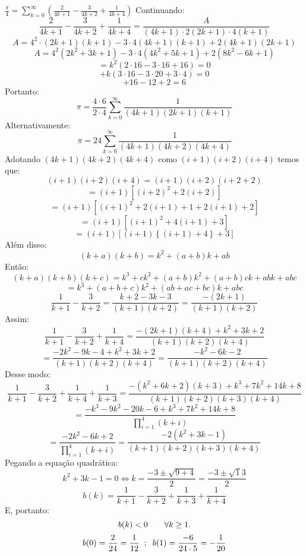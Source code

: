 \documentclass[12pt]{article}
\begin{document}
\hspace{2.5cm} \(\frac{\pi}{4}=\sum_{k=0}^{\infty}\left ( \frac{2}{4k+1}-\frac{3}{4k+2}+\frac{1}{4k+4}\right)\)
\newpage
\normalsize{}
Continuando:
\[
\frac{2}{4k+1} - \frac{3}{4k+2} + \frac{1}{4k+4} = \frac{A}{(4k+1)\cdot2(2k+1)\cdot4(k+1)}
\]
\[A=4^2\cdot(2k+1)(k+1)-3\cdot4(4k+1)(k+1)+2(4k+1)(2k+1)\]
\[
A = 4^{2} \left( 2k^2 + 3k + 1 \right) - 3 \cdot 4 \left( 4k^{2} + 5k + 1 \right) + 2\left(8k^{2} - 6k + 1 \right)
\]
\[
= k^{2} \left( 2 \cdot 16 - 3 \cdot 16 + 16 \right) = 0
\]
\[
+ k\left(3 \cdot 16 - 3 \cdot 20 + 3 \cdot 4\right) = 0
\]
\[
+ 16 - 12 + 2 = 6
\]
Portanto:
\[
\pi = \frac{4 \cdot 6}{2 \cdot 4} \sum_{k=0}^{\infty} \frac{1}{(4k+1)(2k+1)(k+1)}
\]
Alternativamente:
\[
\pi = 24 \sum_{k=0}^{\infty} \frac{1}{(4k+1)(4k+2)(4k+4)} 
\]
Adotando \((4k+1)(4k+2)(4k+4)\) como \((i+1)(i+2)(i+4)\) temos que:
\[
(i+1)(i+2)(i+4) = (i+1)(i+2)(i+2+2)\] 
\[= (i+1)\left[(i+2)^{2} + 2(i+2)\right]
\]
\[
= (i+1)\left[(i+1)^2+2(i+1)+ 1 + 2(i+1) + 2\right]
\]
\[
= (i+1)\left[(i+1)^{2} + 4(i+1) + 3\right]\] 
\[= (i+1)\left[(i+1)\left\{(i+1)+4\right\} + 3\right]
\]
\newpage
Além disso:
\[(k+a)(k+b)=k^2+(a+b)k+ab\]
Então:
\[(k+a)(k+b)(k+c)=k^3+ck^2+(a+b)k^2+(a+b)ck+abk+abc\]
\[=k^3+(a+b+c)k^2+(ab+ac+bc)k+abc\]
\[\frac{1}{k+1}-\frac{3}{k+2}=\frac{k+2-3k-3}{(k+1)(k+2)}=\frac{-(2k+1)}{(k+1)(k+2)}\]
Assim:
\[\frac{1}{k+1}-\frac{3}{k+2}+\frac{1}{k+4}=\frac{-(2k+1)(k+4)+k^2+3k+2}{(k+1)(k+2)(k+4)}\]
\[=\frac{-2k^2-9k-4+k^2+3k+2}{(k+1)(k+2)(k+4)}=\frac{-k^2-6k-2}{(k+1)(k+2)(k+4)}\]
Desse modo:
\[\frac{1}{k+1}-\frac{3}{k+2}+\frac{1}{k+4}+\frac{1}{k+3}=\frac{-(k^2+6k+2)(k+3)+k^3+7k^2+14k+8}{(k+1)(k+2)(k+3)(k+4)}\]
\[=\frac{-k^3-9k^2-20k-6+k^3+7k^2+14k+8}{\prod_{i=1}^{4}(k+i)}\]
\[=\frac{-2k^2-6k+2}{\prod_{i=1}^{4}(k+i)}=\frac{-2(k^2+3k-1)}{(k+1)(k+2)(k+3)(k+4)}\]
Pegando a equação quadrática:
\[k^2+3k-1=0\Leftrightarrow k=\frac{-3\pm\sqrt{9+4}}{2}=\frac{-3\pm\sqrt13}{2}\]
\[b(k)=\frac{1}{k+1}-\frac{3}{k+2}+\frac{1}{k+3}+\frac{1}{k+4}\]
E, portanto:
\[b(k)<0\hspace{0.7cm}\forall k\geq 1.\]
\[b(0)=\frac{2}{24}=\frac{1}{12}\hspace{0.2cm};\hspace{0.2cm}b(1)=\frac{-6}{24\cdot5}=-\frac{1}{20}\]
\end{document}
